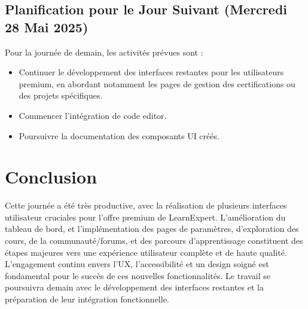 \documentclass[12pt, a4paper]{article}
\begin{document}
\subsection{Planification pour le Jour Suivant (Mercredi 28 Mai 2025)}
Pour la journée de demain, les activités prévues sont :
\begin{itemize}
  \item Continuer le développement des interfaces restantes pour les utilisateurs premium, en abordant notamment les pages de gestion des certifications ou des projets spécifiques.
  \item Commencer l'intégration de code editor.
  \item Poursuivre la documentation des composants UI créés.
\end{itemize}

\section{Conclusion}
Cette journée a été très productive, avec la réalisation de plusieurs interfaces utilisateur cruciales pour l'offre premium de LearnExpert. L'amélioration du tableau de bord, et l'implémentation des pages de paramètres, d'exploration des cours, de la communauté/forums, et des parcours d'apprentissage constituent des étapes majeures vers une expérience utilisateur complète et de haute qualité. L'engagement continu envers l'UX, l'accessibilité et un design soigné est fondamental pour le succès de ces nouvelles fonctionnalités. Le travail se poursuivra demain avec le développement des interfaces restantes et la préparation de leur intégration fonctionnelle.
\end{document}
